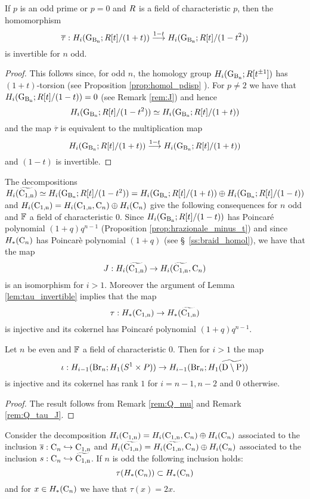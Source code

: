 \begin{lem}\label{lem:tau_invertible}
If $p$ is an odd prime or $p=0$ and $R$ is a field of characteristic $p$, then the homomorphism
$$
\overline{\tau}:H_i(\operatorname{G_{B_{n}}}; R[t]/(1+t)) \stackrel{1-t}{\longrightarrow} H_i(\operatorname{G_{B_{n}}}; R[t]/(1-t^2))
$$
is invertible for $n$ odd.
\end{lem}
\begin{proof}
This follows since, for odd $n$, the homology group $H_i(\operatorname{G_{B_{n}}}; R[t^{\pm 1}])$ has $(1+t)$-torsion (see Proposition \ref{prop:homol_pdisp}
). 
For $p \neq 2$ we have that  $H_i(\operatorname{G_{B_{n}}}; R[t]/(1-t)) = 0$ (see Remark \ref{rem:J}) and hence 
$$
H_i(\operatorname{G_{B_{n}}}; R[t]/(1-t^2)) \simeq H_i(\operatorname{G_{B_{n}}}; R[t]/(1+t))
$$
and the map $\overline{\tau}$ is equivalent to the multiplication map
$$
H_i(\operatorname{G_{B_{n}}}; R[t]/(1+t)) \stackrel{1-t}{\longrightarrow} H_i(\operatorname{G_{B_{n}}}; R[t]/(1+t))
$$
and $(1-t)$ is invertible.
\end{proof}
\begin{rem} \label{rem:Q_tau_J}
The decompositions $H_i(\widetilde{\operatorname{C_{1,n}}}) \simeq H_i(\operatorname{G_{B_{n}}}; R[t]/(1-t^2)) = H_i(\operatorname{G_{B_{n}}}; R[t]/(1+t)) \oplus H_i(\operatorname{G_{B_{n}}}; R[t]/(1-t))$ and $H_i(\operatorname{C_{1,n}}) = H_i(\operatorname{C_{1,n}}, \operatorname{C}_n) \oplus H_i(\operatorname{C}_n)$ give the following consequences for $n$ odd and $\mathbb{F}$ a field of characteristic $0$. Since $H_i(\operatorname{G_{B_{n}}}; R[t]/(1-t))$ has Poincar\'e polynomial $(1+q)q^{n-1}$ (Proposition \ref{prop:hrazionale_minus_t}) and since $H_*(\operatorname{C}_n)$ has Poincar\`e polynomial $(1+q)$ (see \S~\ref{ss:braid_homol}), we have that the map
$$
J: H_i(\widetilde{\operatorname{C_{1,n}}})  \to H_i(\widetilde{\operatorname{C_{1,n}}}, \operatorname{C}_n) 
$$
is an isomorphism for $i>1$.
Moreover the argument of Lemma \ref{lem:tau_invertible} implies that
the map
$$\tau: H_*(\operatorname{C_{1,n}}) \to H_*(\widetilde{\operatorname{C_{1,n}}})$$ is injective and its cokernel has Poincar\'e polynomial $(1+q)q^{n-1}$.
\end{rem}

\begin{prop} \label{prop:coker_n_pari}
Let $n$ be even and $\mathbb{F}$ a field of characteristic $0$. Then for $i>1$ the map 
$$
\iota: H_{i-1}(\operatorname{Br}_n; H_1(S^1 \times P))  \to H_{i-1}(\operatorname{Br}_n; H_1(\widetilde{\mathrm{D} \setminus \mathrm{P}}))
$$
is injective and its cokernel has rank $1$ for $i = n-1, n-2$ and $0$ otherwise.
\end{prop}
\begin{proof}
The result follows from Remark \ref{rem:Q_mu} and Remark \ref{rem:Q_tau_J}.
\end{proof}
\begin{thm} \label{teo:tau_restricted}
Consider the decomposition $H_i(\operatorname{C_{1,n}}) = H_i(\operatorname{C_{1,n}}, \operatorname{C}_n) \oplus H_i(\operatorname{C}_n)$ associated to the inclusion $\overline{s}:\operatorname{C}_n \hookrightarrow \operatorname{C_{1,n}}$ and $H_i(\widetilde{\operatorname{C_{1,n}}}) = H_i(\widetilde{\operatorname{C_{1,n}}}, \operatorname{C}_n) \oplus H_i(\operatorname{C}_n)$ associated to the inclusion $s:\operatorname{C}_n \hookrightarrow \widetilde{\operatorname{C_{1,n}}}$. If $n$ is odd the following inclusion holds: $$\tau(H_*(\operatorname{C}_n)) \subset H_*(\operatorname{C}_n)$$
and for $x \in H_*(\operatorname{C}_n)$ we have that $\tau(x) = 2x$.
\end{thm}


